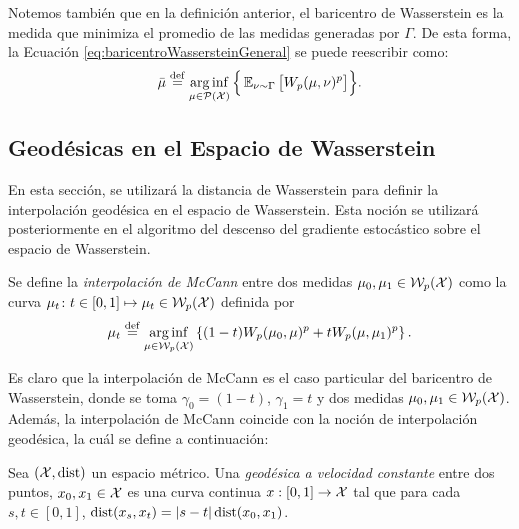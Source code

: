 {{{			\begin{remark}
				Notemos también que en la definición anterior, el baricentro de Wasserstein es la medida que minimiza el promedio de las medidas generadas por $\Gamma$. De esta forma, la Ecuación \eqref{eq:baricentroWassersteinGeneral} se puede reescribir como:
				\begin{equation}
					\bar \mu \eqdef \arginf_{\mu \in \ProbSpace} \Big\{ \Exp_{\nu \sim \Gamma} \big[ \Wasserstein[p]{\mu}{\nu}^p \big] \Big\}.
				\end{equation}

			\end{remark}




		}  %


		\subsection{Geodésicas en el Espacio de Wasserstein}\label{ssec:geodesicas-Wasserstein}
		{
			En esta sección, se utilizará la distancia de Wasserstein para definir la interpolación geodésica en el espacio de Wasserstein. Esta noción se utilizará posteriormente en el algoritmo del descenso del gradiente estocástico sobre el espacio de Wasserstein.

			\begin{definition}
				Se define la \emph{interpolación de McCann} entre dos medidas $\mu_0, \mu_1 \in \WassersteinSpace[p]{\cX} $ como la curva $\mu_t \colon t \in [0, 1] \mapsto \mu_t \in \WassersteinSpace[p]{\cX} $ definida por
				\begin{equation}
					\mu_t \eqdef \arginf_{\mu \in \WassersteinSpace[p]{\cX} } \left\{ (1-t) \Wasserstein[p]{\mu_0}{\mu}^p + t \Wasserstein[p]{\mu}{\mu_1}^p \right\}.
				\end{equation}
			\end{definition}

			Es claro que la interpolación de McCann es el caso particular del baricentro de Wasserstein, donde se toma $\gamma_0 = (1-t)$, $\gamma_1 = t$ y dos medidas $\mu_0, \mu_1 \in \WassersteinSpace[p]{\cX} $. Además, la interpolación de McCann coincide con la noción de interpolación geodésica, la cuál se define a continuación:

			\begin{definition}
				Sea $(\cX, \dist)$ un espacio métrico. Una \emph{geodésica a velocidad constante}  entre dos puntos, $x_0, x_1 \in \cX$ es una curva continua $x : [0, 1] \to \cX$  tal que para cada $s, t \in [0, 1]$, $\dist(x_s,x_t) = |s - t| \dist(x_0,x_1) $.
			\end{definition}

}}}
